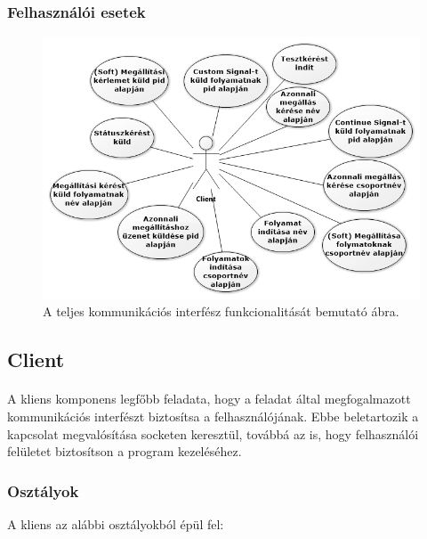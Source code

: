 \documentclass[12pt]{report}
\begin{document}
\pagebreak

 \subsubsection{Felhasználói esetek}
        \begin{figure}[ht]
       \centering
       \includegraphics[width=15cm]{pics/func_uc.png}
	  \caption{A teljes kommunikációs interfész funkcionalitását bemutató ábra. \newline}
  \end{figure}
  
\subsection{Client}
\paragraph{}
A kliens komponens legfőbb feladata, hogy a feladat által megfogalmazott kommunikációs interfészt biztosítsa a felhasználójának. Ebbe beletartozik a kapcsolat megvalósítása socketen keresztül, továbbá az is, hogy felhasználói felületet biztosítson a program kezeléséhez.
    
\subsubsection{Osztályok}
A kliens az alábbi osztályokból épül fel:
\end{document}
